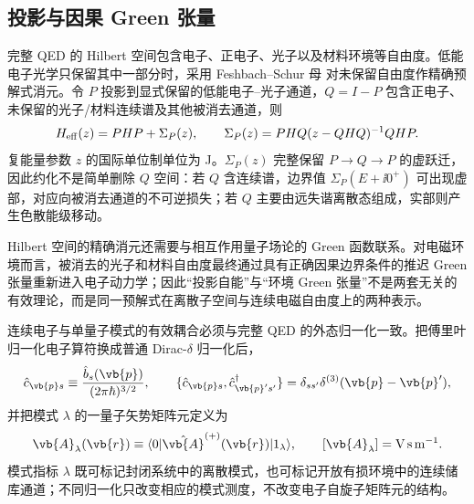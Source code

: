 \subsection{投影与因果 Green 张量}

完整 QED 的 Hilbert 空间包含电子、正电子、光子以及材料环境等自由度。低能电子光学只保留其中一部分时，采用 Feshbach--Schur 母 对未保留自由度作精确预解式消元。令 $P$ 投影到显式保留的低能电子--光子通道，$Q=I-P$ 包含正电子、未保留的光子/材料连续谱及其他被消去通道，则
\begin{equation*}
 H_{\rm eff}(z)=PHP+\Sigma_P(z),
 \qquad
 \Sigma_P(z)=PHQ(z-QHQ)^{-1}QHP.
\end{equation*}
复能量参数 $z$ 的国际单位制单位为 J。$\Sigma_P(z)$ 完整保留 $P\to Q\to P$ 的虚跃迁，因此约化不是简单删除 $Q$ 空间：若 $Q$ 含连续谱，边界值 $\Sigma_P(E+\ii0^+)$ 可出现虚部，对应向被消去通道的不可逆损失；若 $Q$ 主要由远失谐离散态组成，实部则产生色散能级移动。

Hilbert 空间的精确消元还需要与相互作用量子场论的 Green 函数联系。对电磁环境而言，被消去的光子和材料自由度最终通过具有正确因果边界条件的推迟 Green 张量重新进入电子动力学；因此“投影自能”与“环境 Green 张量”不是两套无关的有效理论，而是同一预解式在离散子空间与连续电磁自由度上的两种表示。



连续电子与单量子模式的有效耦合必须与完整 QED 的外态归一化一致。把傅里叶归一化电子算符换成普通 Dirac-$\delta$ 归一化后，
\[
 \hat c_{\vb{p} s}
 \equiv\frac{\hat b_s(\vb{p})}{(2\pi\hbar)^{3/2}},
 \qquad
 \{\hat c_{\vb{p} s},\hat c_{\vb{p}'s'}^\dagger\}
 =\delta_{ss'}\delta^{(3)}(\vb{p}-\vb{p}'),
\]
并把模式 $\lambda$ 的一量子矢势矩阵元定义为
\[
 \vb{A}_\lambda(\vb{r})
 \equiv
 \langle0|\hat{\vb{A}}^{(+)}(\vb{r})|1_\lambda\rangle,
 \qquad
 [\vb{A}_\lambda]=\mathrm{V\,s\,m^{-1}}.
\]
模式指标 $\lambda$ 既可标记封闭系统中的离散模式，也可标记开放有损环境中的连续储库通道；不同归一化只改变相应的模式测度，不改变电子自旋子矩阵元的结构。

